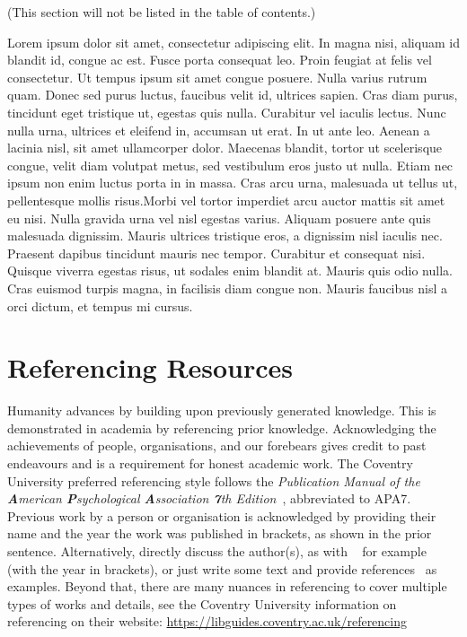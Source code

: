 (This section will not be listed in the table of contents.)

Lorem ipsum dolor sit amet, consectetur adipiscing elit. In magna nisi, aliquam id blandit id, congue ac est. Fusce porta consequat leo. Proin feugiat at felis vel consectetur. Ut tempus ipsum sit amet congue posuere. Nulla varius rutrum quam. Donec sed purus luctus, faucibus velit id, ultrices sapien. Cras diam purus, tincidunt eget tristique ut, egestas quis nulla. Curabitur vel iaculis lectus. Nunc nulla urna, ultrices et eleifend in, accumsan ut erat. In ut ante leo. Aenean a lacinia nisl, sit amet ullamcorper dolor. Maecenas blandit, tortor ut scelerisque congue, velit diam volutpat metus, sed vestibulum eros justo ut nulla. Etiam nec ipsum non enim luctus porta in in massa. Cras arcu urna, malesuada ut tellus ut, pellentesque mollis risus.Morbi vel tortor imperdiet arcu auctor mattis sit amet eu nisi. Nulla gravida urna vel nisl egestas varius. Aliquam posuere ante quis malesuada dignissim. Mauris ultrices tristique eros, a dignissim nisl iaculis nec. Praesent dapibus tincidunt mauris nec tempor. Curabitur et consequat nisi. Quisque viverra egestas risus, ut sodales enim blandit at. Mauris quis odio nulla. Cras euismod turpis magna, in facilisis diam congue non. Mauris faucibus nisl a orci dictum, et tempus mi cursus.

\section{Referencing Resources}

Humanity advances by building upon previously generated knowledge. This is demonstrated in academia by referencing prior knowledge. Acknowledging the achievements of people, organisations, and our forebears gives credit to past endeavours and is a requirement for honest academic work. The Coventry University preferred referencing style follows the \emph{Publication Manual of the \textbf{A}merican \textbf{P}sychological \textbf{A}ssociation \textbf{7}th Edition}~\parencite{APA72019}, abbreviated to APA7. Previous work by a person or organisation is acknowledged by providing their name and the year the work was published in brackets, as shown in the prior sentence. Alternatively, directly discuss the author(s), as with ~\textcite{Rea85,Knuth1986} for example (with the year in brackets), or just write some text and provide references~\parencite{AAB95,Con90,LM65} as examples. Beyond that, there are many nuances in referencing to cover multiple types of works and details, see the Coventry University information on referencing on their website: \url{https://libguides.coventry.ac.uk/referencing}

